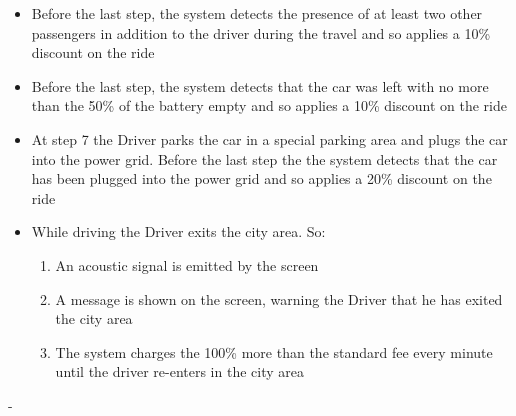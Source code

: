 {
	\begin{itemize}
	\item Before the last step, the system detects the presence of at least two other passengers in addition to the driver during the 		         travel and so applies a 10\% discount on the ride
	\item Before the last step, the system detects that the car was left with no more than the 50\% of the battery empty and so 			         applies a 10\% discount on the ride
	\item At step 7 the Driver parks the car in a special parking area and plugs the car into the power grid. Before the last step the 
	         the system detects that the car has been plugged into the power grid and so applies a 20\% discount on the ride
	\item While driving the Driver exits the city area. So:
		\begin{enumerate}
		\item An acoustic signal is emitted by the screen
		\item A message is shown on the screen, warning the Driver that he has exited the city area
		\item The system charges the 100\% more than the standard fee every minute until the driver re-enters in the city area
		\end{enumerate} 
	\end{itemize}

}
{-}





\FloatBarrier



